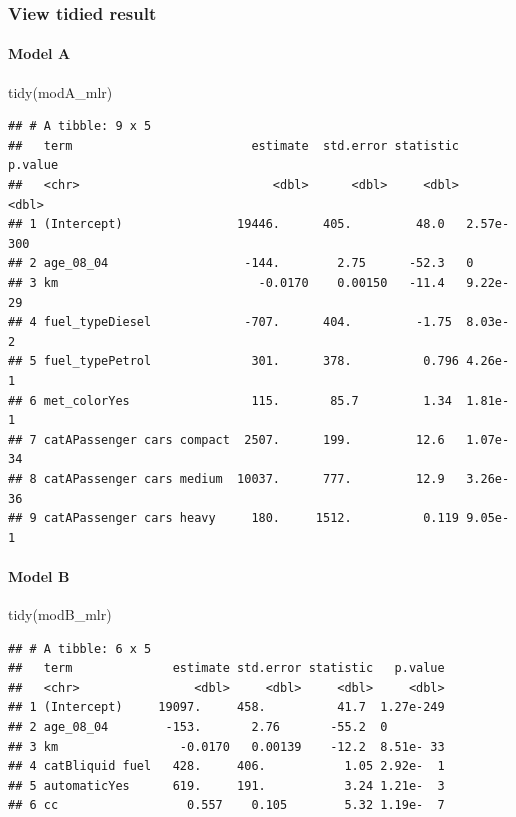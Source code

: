 \documentclass[
]{article}
\newenvironment{Shaded}{\begin{snugshade}}{\end{snugshade}}
\newcommand{\FunctionTok}[1]{\textcolor[rgb]{0.00,0.00,0.00}{#1}}
\newcommand{\NormalTok}[1]{#1}
\begin{document}
\hypertarget{view-tidied-result}{%
\subsubsection{View tidied result}\label{view-tidied-result}}

\hypertarget{model-a-9}{%
\paragraph{Model A}\label{model-a-9}}

\begin{Shaded}
\begin{Highlighting}[]
\FunctionTok{tidy}\NormalTok{(modA\_mlr)}
\end{Highlighting}
\end{Shaded}

\begin{verbatim}
## # A tibble: 9 x 5
##   term                         estimate  std.error statistic   p.value
##   <chr>                           <dbl>      <dbl>     <dbl>     <dbl>
## 1 (Intercept)                19446.      405.         48.0   2.57e-300
## 2 age_08_04                   -144.        2.75      -52.3   0        
## 3 km                            -0.0170    0.00150   -11.4   9.22e- 29
## 4 fuel_typeDiesel             -707.      404.         -1.75  8.03e-  2
## 5 fuel_typePetrol              301.      378.          0.796 4.26e-  1
## 6 met_colorYes                 115.       85.7         1.34  1.81e-  1
## 7 catAPassenger cars compact  2507.      199.         12.6   1.07e- 34
## 8 catAPassenger cars medium  10037.      777.         12.9   3.26e- 36
## 9 catAPassenger cars heavy     180.     1512.          0.119 9.05e-  1
\end{verbatim}

\hypertarget{model-b-9}{%
\paragraph{Model B}\label{model-b-9}}

\begin{Shaded}
\begin{Highlighting}[]
\FunctionTok{tidy}\NormalTok{(modB\_mlr)}
\end{Highlighting}
\end{Shaded}

\begin{verbatim}
## # A tibble: 6 x 5
##   term              estimate std.error statistic   p.value
##   <chr>                <dbl>     <dbl>     <dbl>     <dbl>
## 1 (Intercept)     19097.     458.          41.7  1.27e-249
## 2 age_08_04        -153.       2.76       -55.2  0        
## 3 km                 -0.0170   0.00139    -12.2  8.51e- 33
## 4 catBliquid fuel   428.     406.           1.05 2.92e-  1
## 5 automaticYes      619.     191.           3.24 1.21e-  3
## 6 cc                  0.557    0.105        5.32 1.19e-  7
\end{verbatim}
\end{document}
